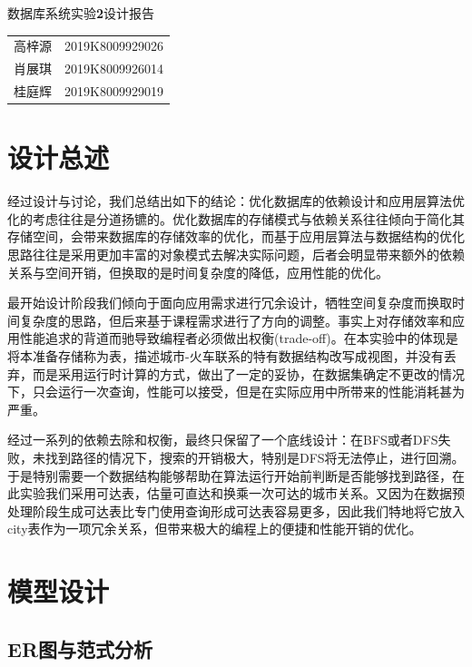 \documentclass[UTF-8,twoside,c5size,hyperref]{ctexart}
\begin{document}
	\begin{center}
		\heiti{}
		数据库系统实验\textbf{2}设计报告
	\end{center}

	\begin{table}[!h]
        \raggedleft
        \begin{tabular}{rc}
            高梓源 & 2019K8009929026\\
            肖展琪 & 2019K8009926014\\
            桂庭辉 & 2019K8009929019
        \end{tabular}
    \end{table}
    
    \section{设计总述}
    
    经过设计与讨论，我们总结出如下的结论：优化数据库的依赖设计和应用层算法优化的考虑往往是分道扬镳的。优化数据库的存储模式与依赖关系往往倾向于简化其存储空间，会带来数据库的存储效率的优化，而基于应用层算法与数据结构的优化思路往往是采用更加丰富的对象模式去解决实际问题，后者会明显带来额外的依赖关系与空间开销，但换取的是时间复杂度的降低，应用性能的优化。
    
    最开始设计阶段我们倾向于面向应用需求进行冗余设计，牺牲空间复杂度而换取时间复杂度的思路，但后来基于课程需求进行了方向的调整。事实上对存储效率和应用性能追求的背道而驰导致编程者必须做出权衡(trade-off)。在本实验中的体现是将本准备存储称为表，描述城市-火车联系的特有数据结构改写成视图，并没有丢弃，而是采用运行时计算的方式，做出了一定的妥协，在数据集确定不更改的情况下，只会运行一次查询，性能可以接受，但是在实际应用中所带来的性能消耗甚为严重。
    
    经过一系列的依赖去除和权衡，最终只保留了一个底线设计：在BFS或者DFS失败，未找到路径的情况下，搜索的开销极大，特别是DFS将无法停止，进行回溯。于是特别需要一个数据结构能够帮助在算法运行开始前判断是否能够找到路径，在此实验我们采用可达表，估量可直达和换乘一次可达的城市关系。又因为在数据预处理阶段生成可达表比专门使用查询形成可达表容易更多，因此我们特地将它放入city表作为一项冗余关系，但带来极大的编程上的便捷和性能开销的优化。
    
    \section{模型设计}
    \subsection{\textbf{ER}图与范式分析}
    
\end{document}
